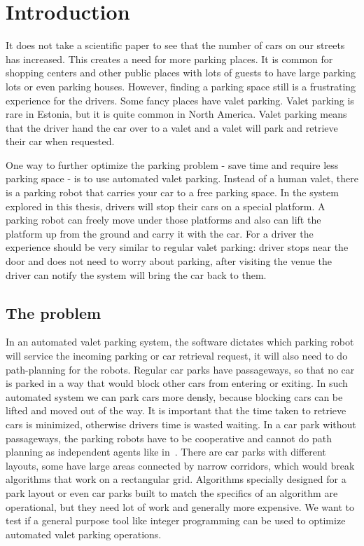 \section{Introduction}
\justify
It does not take a scientific paper to see that the number of cars on our
streets has increased. This creates a need for more parking places. It is
common for shopping centers and other public places with lots of guests to have
large parking lots or even parking houses. However, finding a parking space
still is a frustrating experience for the drivers. Some fancy places have valet
parking. Valet parking is rare in Estonia, but it is quite common in North
America. Valet parking means that the driver hand the car over to a valet and a
valet will park and retrieve their car when requested.

One way to further optimize the parking problem - save time and require less 
parking space - is to use automated valet parking.
Instead of a human valet, there is a parking robot that
carries your car to a free parking space. In the system explored in this
thesis, drivers will stop their cars on a special platform. A parking robot can
freely move under those platforms and also can lift the platform up from the
ground and carry it with the car. For a driver the experience should be very 
similar to regular valet parking: driver stops near the door and does not need to worry about parking,
after visiting the venue the driver can notify the system will bring the
car back to them.
\subsection{The problem}
In an automated valet parking system, the software dictates which parking robot 
will service the incoming parking or car retrieval request, it will also need 
to do path-planning for the robots. 
Regular car parks have passageways, so that no car is parked in a way that would block
other cars from entering or exiting. In such automated system we can park cars
more densly, because blocking cars can be lifted and moved out of the way.
It is important that the time taken to retrieve cars is minimized, otherwise
drivers time is wasted waiting. In a car park without passageways, the parking 
robots have to be cooperative and cannot do path planning as independent agents 
like in~\cite{wurman2008coordinating}. There are car parks with different layouts, 
some have large areas connected by narrow corridors, which would break algorithms 
that work on a rectangular grid. Algorithms specially designed for a park layout 
or even car parks built to match the specifics of an algorithm are operational, 
but they need lot of work and generally more expensive. We want to test if a 
general purpose tool like integer programming can be used to optimize automated 
valet parking operations.

